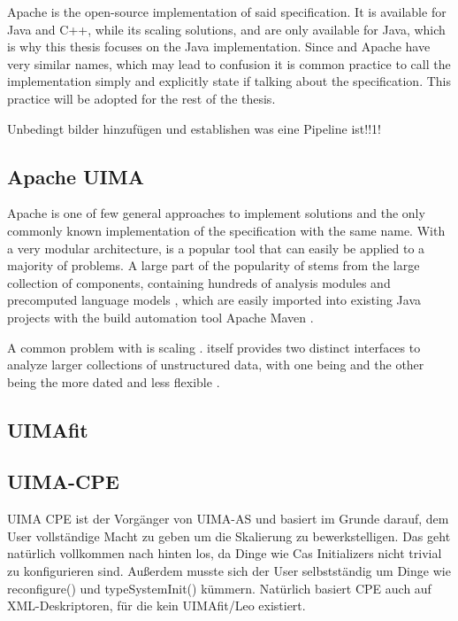 Apache \uima{} is the open-source implementation of said \uima{} specification. It is available for Java and C++, while its scaling solutions, \uimacpe{} and \uimaas{} are only available for Java, which is why this thesis focuses on the Java implementation. Since \uima{} and Apache \uima{} have very similar names, which may lead to confusion it is common practice to call the implementation simply \uima{} and explicitly state if talking about the specification. This practice will be adopted for the rest of the thesis.

Unbedingt bilder hinzufügen und establishen was eine Pipeline ist!!1!

\subsection{Apache UIMA}

Apache \uima{} is one of few general approaches to implement \nlp{} solutions and the only commonly known implementation of the specification with the same name. With a very modular architecture, \uima{} is a popular tool that can easily be applied to a majority of \nlp{} problems. A large part of the popularity of \uima{} stems from the large \dkpro{} collection of components, containing hundreds of analysis modules and precomputed language models \cite{eckartdecastilho-gurevych:2014:OIAF4HLT}, which are easily imported into existing Java projects with the build automation tool Apache Maven \cite{dkpro}.

A common problem with \uima{} is scaling \cite{divita2015scaling,epstein2012making,ramakrishnan2010building}. \uima{} itself provides two distinct interfaces to analyze larger collections of unstructured data, with one being \uimaas{} and the other being the more dated and less flexible \cpe{} \cite{OASIS:UIMA:2009}.


\subsection{UIMAfit}
\subsection{UIMA-CPE}
UIMA CPE ist der Vorgänger von UIMA-AS und basiert im Grunde darauf, dem User vollständige Macht zu geben um die Skalierung zu bewerkstelligen. Das geht natürlich vollkommen nach hinten los, da Dinge wie Cas Initializers nicht trivial zu konfigurieren sind. Außerdem musste sich der User selbstständig um Dinge wie reconfigure() und typeSystemInit() kümmern. 
Natürlich basiert CPE auch auf XML-Deskriptoren, für die kein UIMAfit/Leo existiert.

